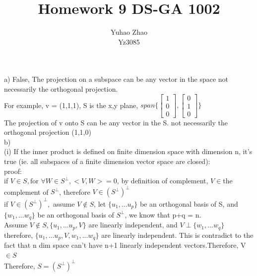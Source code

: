 \documentclass[11pt]{article}
\newenvironment{problem}[2][Problem]{\begin{trivlist}
\item[\hskip \labelsep {\bfseries #1}\hskip \labelsep {\bfseries #2.}]}{\end{trivlist}}
\begin{document}
 
 
\title{Homework 9 DS-GA 1002 }%
\author{Yuhao Zhao\\ %
Yz3085} %
 
\maketitle
\begin{problem}{1}
\end{problem}
a) False, The projection on a subspace can be any vector in the space not necessarily the orthogonal projection. \\
For example, v = (1,1,1),  S is the x,y plane,  $span\{\begin{bmatrix}
	1\\0\\0
	\end{bmatrix},\begin{bmatrix}
	0\\1\\0
	\end{bmatrix} \}$\\ The projection of v onto S can be any vector in the S. not necessarily the orthogonal projection (1,1,0)\\
	
b)\\   (i) If the inner product is defined on finite dimension space with dimension n, it's true (ie. all subspaces of a finite dimension vector space are closed):\\

proof:\\ if $V \in S,\text{for}$ $ \forall W \in S^{\perp}, <V,W> = 0$, by definition of complement, $V \in $the complement of $S^{\perp}$, therefore $V\in  (S^{\perp})^{\perp}$\\
if $V \in (S^{\perp})^{\perp},$ assume $V \notin S$, let $\{u_1,...u_p\}$ be an orthogonal basis of S, and $\{w_1,...w_q\}$  be an orthogonal basis of $S^{\perp}$, we know that p+q = n.\\ Assume $V\notin S, \{u_1,...u_p,V\}$ are linearly independent, and $V \perp\{w_1,...w_q\} $\\ therefore, $\{u_1,...u_p,V,w_1,...w_q\}$ are linearly independent. This is contradict to the fact that n dim space can't have  n+1 linearly independent vectors.Therefore, V $\in S$\\
Therefore, $S = (S^{\perp})^{\perp}$\\
\end{document}
